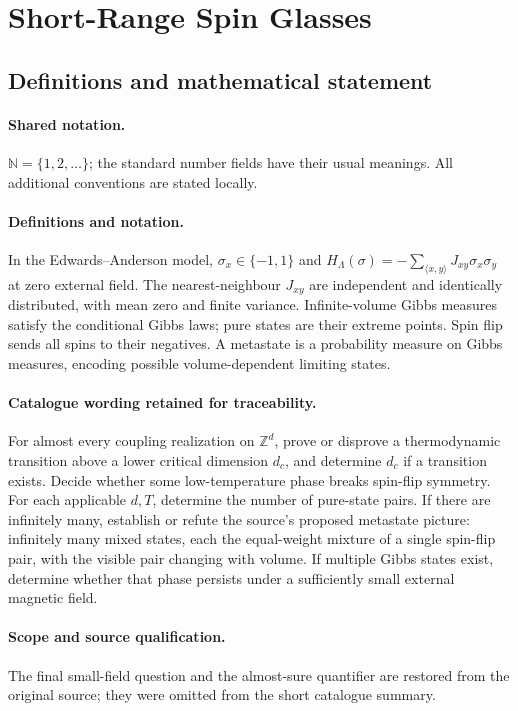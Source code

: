\documentclass[11pt]{article}
\begin{document}
\section{Short-Range Spin Glasses}\label{statement}

\subsection{Definitions and mathematical statement}

\paragraph{Shared notation.}$\mathbb N=\{1,2,\ldots\}$; the standard number fields have their usual meanings. All additional conventions are stated locally.


\paragraph{Definitions and notation.}In the Edwards--Anderson model, $\sigma_x\in\{-1,1\}$ and $H_\Lambda(\sigma)=-\sum_{\langle x,y\rangle}J_{xy}\sigma_x\sigma_y$ at zero external field. The nearest-neighbour $J_{xy}$ are independent and identically distributed, with mean zero and finite variance. Infinite-volume Gibbs measures satisfy the conditional Gibbs laws; pure states are their extreme points. Spin flip sends all spins to their negatives. A metastate is a probability measure on Gibbs measures, encoding possible volume-dependent limiting states.

\paragraph{Catalogue wording retained for traceability.}
For almost every coupling realization on $\mathbb Z^d$, prove or disprove a thermodynamic transition above a lower critical dimension $d_c$, and determine $d_c$ if a transition exists. Decide whether some low-temperature phase breaks spin-flip symmetry. For each applicable $d,T$, determine the number of pure-state pairs. If there are infinitely many, establish or refute the source’s proposed metastate picture: infinitely many mixed states, each the equal-weight mixture of a single spin-flip pair, with the visible pair changing with volume. If multiple Gibbs states exist, determine whether that phase persists under a sufficiently small external magnetic field.
\paragraph{Scope and source qualification.}The final small-field question and the almost-sure quantifier are restored from the original source; they were omitted from the short catalogue summary.
\end{document}
